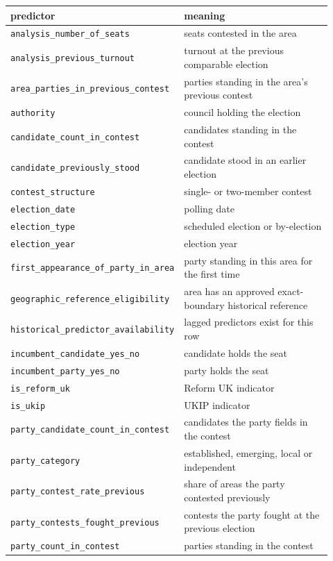 \begin{tabular}{p{0.42\linewidth}p{0.50\linewidth}}
\toprule
predictor & meaning \\
\midrule
\texttt{analysis\_number\_of\_seats} & seats contested in the area \\
\texttt{analysis\_previous\_turnout} & turnout at the previous comparable election \\
\texttt{area\_parties\_in\_previous\_contest} & parties standing in the area's previous contest \\
\texttt{authority} & council holding the election \\
\texttt{candidate\_count\_in\_contest} & candidates standing in the contest \\
\texttt{candidate\_previously\_stood} & candidate stood in an earlier election \\
\texttt{contest\_structure} & single- or two-member contest \\
\texttt{election\_date} & polling date \\
\texttt{election\_type} & scheduled election or by-election \\
\texttt{election\_year} & election year \\
\texttt{first\_appearance\_of\_party\_in\_area} & party standing in this area for the first time \\
\texttt{geographic\_reference\_eligibility} & area has an approved exact-boundary historical reference \\
\texttt{historical\_predictor\_availability} & lagged predictors exist for this row \\
\texttt{incumbent\_candidate\_yes\_no} & candidate holds the seat \\
\texttt{incumbent\_party\_yes\_no} & party holds the seat \\
\texttt{is\_reform\_uk} & Reform UK indicator \\
\texttt{is\_ukip} & UKIP indicator \\
\texttt{party\_candidate\_count\_in\_contest} & candidates the party fields in the contest \\
\texttt{party\_category} & established, emerging, local or independent \\
\texttt{party\_contest\_rate\_previous} & share of areas the party contested previously \\
\texttt{party\_contests\_fought\_previous} & contests the party fought at the previous election \\
\texttt{party\_count\_in\_contest} & parties standing in the contest \\

\end{tabular}
